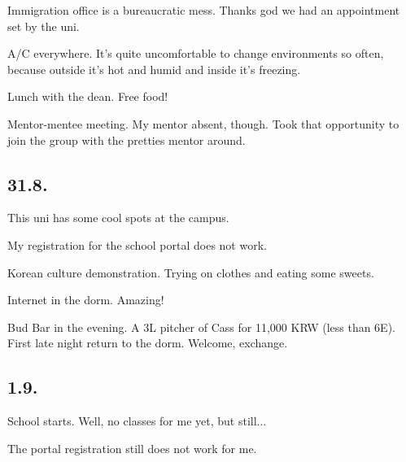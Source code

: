 \begin{post}
\begin{content}
\begin{itemize*}
	\item Immigration office is a bureaucratic mess. Thanks god we had an appointment set by the uni.

	\item A/C everywhere. It's quite uncomfortable to change environments so often, because outside it's hot and humid and inside it's freezing.

	\item Lunch with the dean. Free food!

	\item Mentor-mentee meeting. My mentor absent, though. Took that opportunity to join the group with the pretties mentor around.

\end{itemize*}

\subsection{31.8.}

\begin{itemize*}

	\item This uni has some cool spots at the campus.

	\item My registration for the school portal does not work.

	\item Korean culture demonstration. Trying on clothes and eating some sweets.

	\item Internet in the dorm. Amazing!

	\item Bud Bar in the evening. A 3L pitcher of Cass for 11,000 KRW (less than 6E). First late night return to the dorm. Welcome, exchange.

\end{itemize*}



\subsection{1.9.}



\begin{itemize*}

	\item School starts. Well, no classes for me yet, but still...

	\item The portal registration still does not work for me.


\end{itemize*}
\end{content}
\end{post}
